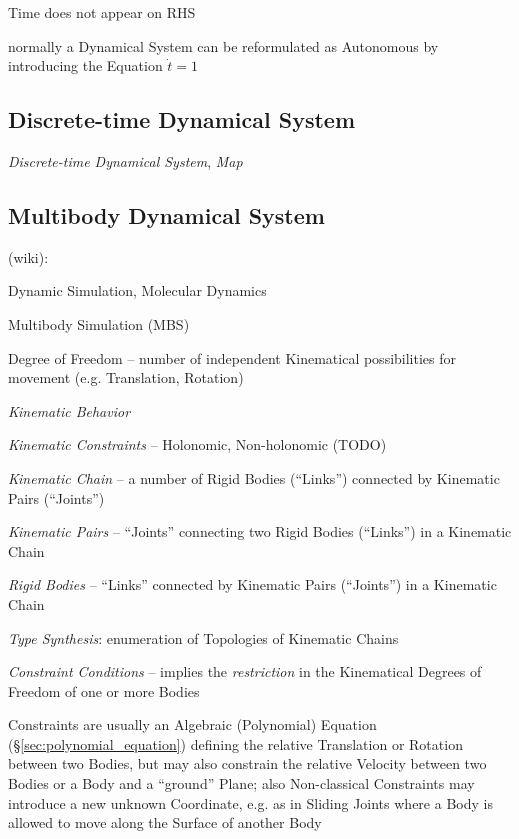 Time does not appear on RHS

normally a Dynamical System can be reformulated as Autonomous by introducing
the Equation $\dot{t} = 1$



\subsection{Discrete-time Dynamical System}\label{sec:discrete_dynamical_system}

\emph{Discrete-time Dynamical System}, \emph{Map}



\subsection{Multibody Dynamical System}\label{sec:multibody_system}

(wiki):

Dynamic Simulation, Molecular Dynamics

Multibody Simulation (MBS)

Degree of Freedom -- number of independent Kinematical possibilities for
movement (e.g. Translation, Rotation)

\emph{Kinematic Behavior}

\emph{Kinematic Constraints} -- Holonomic, Non-holonomic (TODO)

\emph{Kinematic Chain} -- a number of Rigid Bodies (``Links'') connected by
Kinematic Pairs (``Joints'')

\emph{Kinematic Pairs} -- ``Joints'' connecting two Rigid Bodies (``Links'') in
a Kinematic Chain

\emph{Rigid Bodies} -- ``Links'' connected by Kinematic Pairs (``Joints'') in a
Kinematic Chain

\emph{Type Synthesis}: enumeration of Topologies of Kinematic Chains

\emph{Constraint Conditions} -- implies the \emph{restriction} in the
Kinematical Degrees of Freedom of one or more Bodies

Constraints are usually an Algebraic (Polynomial) Equation
(\S\ref{sec:polynomial_equation}) defining the relative Translation or Rotation
between two Bodies, but may also constrain the relative Velocity between two
Bodies or a Body and a ``ground'' Plane; also Non-classical Constraints may
introduce a new unknown Coordinate, e.g. as in Sliding Joints where a Body is
allowed to move along the Surface of another Body

